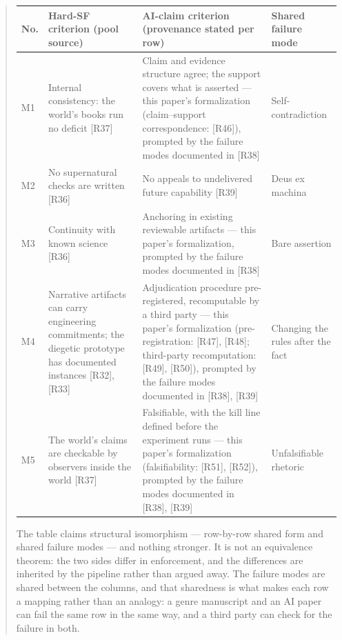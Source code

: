 \documentclass[11pt,a4paper]{article}
\begin{document}
\begin{abstract}
\begin{table}[htbp]
\centering
\small
\setlength{\tabcolsep}{3.5pt}
\renewcommand{\arraystretch}{1.18}
\begin{tabularx}{0.985\textwidth}{@{}>{\raggedright\arraybackslash}p{}>{\raggedright\arraybackslash}X>{\raggedright\arraybackslash}X>{\raggedright\arraybackslash}p{}@{}}
\toprule
\textbf{No.} & \textbf{Hard-SF criterion (pool source)} & \textbf{AI-claim criterion (provenance stated per row)} & \textbf{Shared failure mode} \\
\midrule
M1 & Internal consistency: the world's books run no deficit [R37] & Claim and evidence structure agree; the support covers what is asserted — this paper's formalization (claim–support correspondence: [R46]), prompted by the failure modes documented in [R38] & Self-contradiction \\
M2 & No supernatural checks are written [R36] & No appeals to undelivered future capability [R39] & Deus ex machina \\
M3 & Continuity with known science [R36] & Anchoring in existing reviewable artifacts — this paper's formalization, prompted by the failure modes documented in [R38] & Bare assertion \\
M4 & Narrative artifacts can carry engineering commitments; the diegetic prototype has documented instances [R32], [R33] & Adjudication procedure pre-registered, recomputable by a third party — this paper's formalization (pre-registration: [R47], [R48]; third-party recomputation: [R49], [R50]), prompted by the failure modes documented in [R38], [R39] & Changing the rules after the fact \\
M5 & The world's claims are checkable by observers inside the world [R37] & Falsifiable, with the kill line defined before the experiment runs — this paper's formalization (falsifiability: [R51], [R52]), prompted by the failure modes documented in [R38], [R39] & Unfalsifiable rhetoric \\
\bottomrule
\end{tabularx}
\end{table}

The table claims structural isomorphism — row-by-row shared form and shared failure modes — and nothing stronger. It is not an equivalence theorem: the two sides differ in enforcement, and the differences are inherited by the pipeline rather than argued away. The failure modes are shared between the columns, and that sharedness is what makes each row a mapping rather than an analogy: a genre manuscript and an AI paper can fail the same row in the same way, and a third party can check for the failure in both.


\end{abstract}
\end{document}
